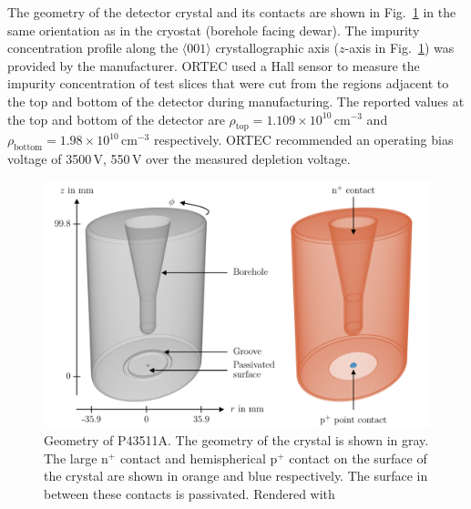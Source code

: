 The geometry of the detector crystal and its contacts are shown in Fig.~\ref*{fig:ic_semiconductor} in the same orientation as in the cryostat (borehole facing dewar). The impurity concentration profile along the $\langle001\rangle$ crystallographic axis ($z$-axis in Fig.~\ref*{fig:ic_semiconductor}) was provided by the manufacturer. ORTEC used a Hall sensor to measure the impurity concentration of test slices that were cut from the regions adjacent to the top and bottom of the detector during manufacturing. The reported values at the top and bottom of the detector are $\rho_{\text{top}} = 1.109\times 10^{10}\,\text{cm}^{-3}$ and $\rho_{\text{bottom}} = 1.98\times 10^{10}\,\text{cm}^{-3}$ respectively. ORTEC recommended an operating bias voltage of 3500\,V, 550\,V over the measured depletion voltage.  
\begin{figure}[htb]
    \centering
    \includegraphics[width=6in]{figs/integration/P43511A_labeled_width_6_9in.pdf}
    \caption{Geometry of P43511A. The geometry of the crystal is shown in gray. The large n$^+$ contact and hemispherical p$^+$ contact on the surface of the crystal are shown in orange and blue respectively. The surface in between these contacts is passivated. Rendered with \SSD}
    \label{fig:ic_semiconductor}
\end{figure}


